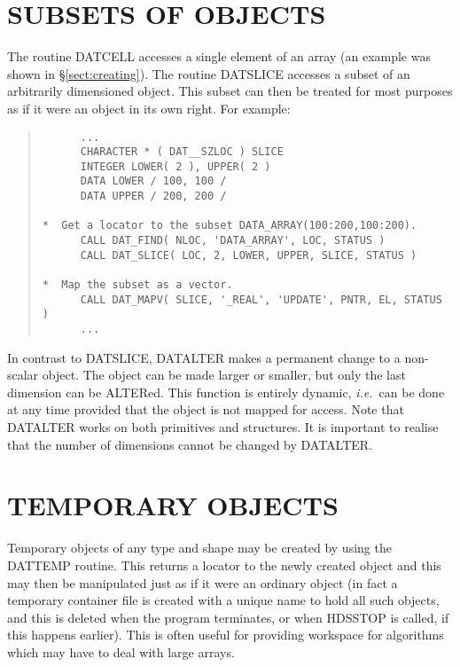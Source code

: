 \documentclass[twoside,11pt]{article}
\newcommand{\htmlref}[2]{#1}
\newcommand{\xlabel}[1]{}
\renewcommand{\_}{\texttt{\symbol{95}}}
\newcommand{\st}[1]{{\em{#1}}}
\begin{document}
\section{\xlabel{accessing_subsets}SUBSETS OF OBJECTS}

The routine \htmlref{DAT\_CELL}{DAT_CELL} accesses a single element of
an array (an example was shown in \S\ref{sect:creating}). The routine
\htmlref{DAT\_SLICE}{DAT_SLICE} accesses a subset of an arbitrarily
dimensioned object. This subset can then be treated for most purposes
as if it were an object in its own right. For example:

\small
\begin{quote}
\begin{verbatim}
      ...
      CHARACTER * ( DAT__SZLOC ) SLICE
      INTEGER LOWER( 2 ), UPPER( 2 )
      DATA LOWER / 100, 100 /
      DATA UPPER / 200, 200 /

*  Get a locator to the subset DATA_ARRAY(100:200,100:200).
      CALL DAT_FIND( NLOC, 'DATA_ARRAY', LOC, STATUS )
      CALL DAT_SLICE( LOC, 2, LOWER, UPPER, SLICE, STATUS )

*  Map the subset as a vector.
      CALL DAT_MAPV( SLICE, '_REAL', 'UPDATE', PNTR, EL, STATUS )
      ...
\end{verbatim}
\end{quote}
\normalsize

In contrast to DAT\_SLICE, \htmlref{DAT\_ALTER}{DAT_ALTER} makes a
permanent change to a non-scalar object. The object can be made larger
or smaller, but only the last dimension can be ALTERed. This function
is entirely dynamic, \st{i.e.}\ can be done at any time provided that
the object is not mapped for access. Note that DAT\_ALTER works on
both primitives and structures. It is important to realise that the
number of dimensions cannot be changed by DAT\_ALTER.

\section{\xlabel{temporary_objects}TEMPORARY OBJECTS}

Temporary objects of any \htmlref{type}{sect:type} and \htmlref{shape}{sect:shape} may be
created by using the \htmlref{DAT\_TEMP}{DAT_TEMP} routine. This
returns a \htmlref{locator}{sect:locators} to the newly created object and this may then be
manipulated just as if it were an ordinary object (in fact a temporary
container file is created with a unique name to hold all such objects,
and this is deleted when the program terminates, or when
\htmlref{HDS\_STOP}{HDS_STOP} is called, if this happens
earlier). This is often useful for providing workspace for algorithms
which may have to deal with large arrays.
\end{document}
